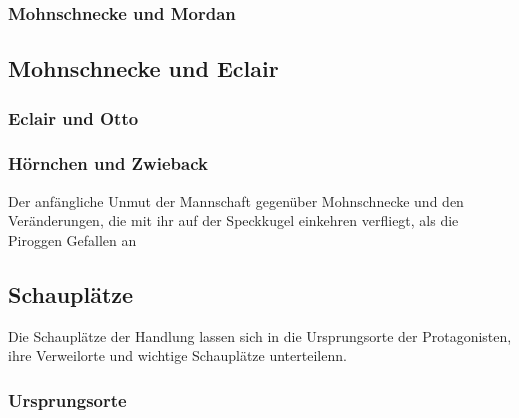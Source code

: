 {\subsubsection {Mohnschnecke und Mordan}
\subsection{Mohnschnecke und Eclair}
\subsubsection {Eclair und Otto}
\subsubsection{Hörnchen und Zwieback}
Der anfängliche Unmut der Mannschaft gegenüber Mohnschnecke und den Veränderungen, die mit ihr auf der 
Speckkugel einkehren \cite[S. 77 f]{pir} verfliegt, als die Piroggen Gefallen an 

\subsection{Schauplätze}
Die Schauplätze der Handlung lassen sich in die Ursprungsorte der Protagonisten, ihre Verweilorte und wichtige Schauplätze unterteilenn.

\subsubsection{Ursprungsorte}

}
